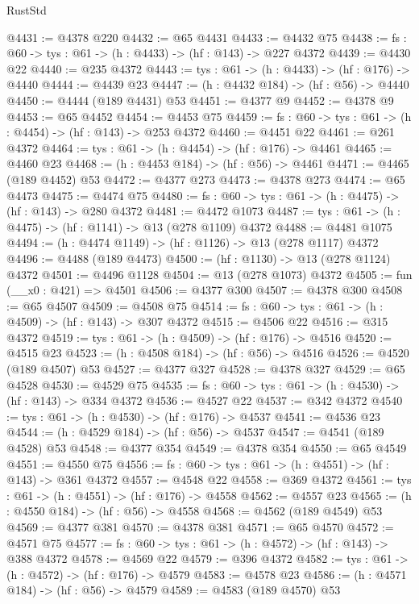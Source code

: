 \begin{lexlean}{RustStd}
\begin{coremodule}
@4431 := @4378 @220
@4432 := @65 @4431
@4433 := @4432 @75
@4438 := {fs : @60} -> {tys : @61} -> (h : @4433) -> (hf : @143) -> @227 @4372
@4439 := @4430 @22
@4440 := @235 @4372
@4443 := {tys : @61} -> (h : @4433) -> (hf : @176) -> @4440
@4444 := @4439 @23
@4447 := (h : @4432 @184) -> (hf : @56) -> @4440
@4450 := @4444 (@189 @4431) @53
@4451 := @4377 @9
@4452 := @4378 @9
@4453 := @65 @4452
@4454 := @4453 @75
@4459 := {fs : @60} -> {tys : @61} -> (h : @4454) -> (hf : @143) -> @253 @4372
@4460 := @4451 @22
@4461 := @261 @4372
@4464 := {tys : @61} -> (h : @4454) -> (hf : @176) -> @4461
@4465 := @4460 @23
@4468 := (h : @4453 @184) -> (hf : @56) -> @4461
@4471 := @4465 (@189 @4452) @53
@4472 := @4377 @273
@4473 := @4378 @273
@4474 := @65 @4473
@4475 := @4474 @75
@4480 := {fs : @60} -> {tys : @61} -> (h : @4475) -> (hf : @143) -> @280 @4372
@4481 := @4472 @1073
@4487 := {tys : @61} -> (h : @4475) -> (hf : @1141) -> @13 (@278 @1109) @4372
@4488 := @4481 @1075
@4494 := (h : @4474 @1149) -> (hf : @1126) -> @13 (@278 @1117) @4372
@4496 := @4488 (@189 @4473)
@4500 := (hf : @1130) -> @13 (@278 @1124) @4372
@4501 := @4496 @1128
@4504 := @13 (@278 @1073) @4372
@4505 := fun (__x0 : @421) => @4501
@4506 := @4377 @300
@4507 := @4378 @300
@4508 := @65 @4507
@4509 := @4508 @75
@4514 := {fs : @60} -> {tys : @61} -> (h : @4509) -> (hf : @143) -> @307 @4372
@4515 := @4506 @22
@4516 := @315 @4372
@4519 := {tys : @61} -> (h : @4509) -> (hf : @176) -> @4516
@4520 := @4515 @23
@4523 := (h : @4508 @184) -> (hf : @56) -> @4516
@4526 := @4520 (@189 @4507) @53
@4527 := @4377 @327
@4528 := @4378 @327
@4529 := @65 @4528
@4530 := @4529 @75
@4535 := {fs : @60} -> {tys : @61} -> (h : @4530) -> (hf : @143) -> @334 @4372
@4536 := @4527 @22
@4537 := @342 @4372
@4540 := {tys : @61} -> (h : @4530) -> (hf : @176) -> @4537
@4541 := @4536 @23
@4544 := (h : @4529 @184) -> (hf : @56) -> @4537
@4547 := @4541 (@189 @4528) @53
@4548 := @4377 @354
@4549 := @4378 @354
@4550 := @65 @4549
@4551 := @4550 @75
@4556 := {fs : @60} -> {tys : @61} -> (h : @4551) -> (hf : @143) -> @361 @4372
@4557 := @4548 @22
@4558 := @369 @4372
@4561 := {tys : @61} -> (h : @4551) -> (hf : @176) -> @4558
@4562 := @4557 @23
@4565 := (h : @4550 @184) -> (hf : @56) -> @4558
@4568 := @4562 (@189 @4549) @53
@4569 := @4377 @381
@4570 := @4378 @381
@4571 := @65 @4570
@4572 := @4571 @75
@4577 := {fs : @60} -> {tys : @61} -> (h : @4572) -> (hf : @143) -> @388 @4372
@4578 := @4569 @22
@4579 := @396 @4372
@4582 := {tys : @61} -> (h : @4572) -> (hf : @176) -> @4579
@4583 := @4578 @23
@4586 := (h : @4571 @184) -> (hf : @56) -> @4579
@4589 := @4583 (@189 @4570) @53

\end{coremodule}
\end{lexlean}
